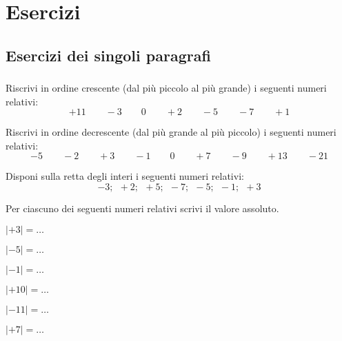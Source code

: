 
\section{Esercizi}

\subsection{Esercizi dei singoli paragrafi}

\subsubsection*{}


\begin{esercizio}
 \label{ese:2.1}
Riscrivi in ordine crescente (dal più piccolo al più grande) i seguenti 
numeri 
relativi:
\[+11\qquad-3\qquad0\qquad+2\qquad-5\qquad-7\qquad+1\]
\end{esercizio}

\begin{esercizio}
 \label{ese:2.2}
Riscrivi in ordine decrescente (dal più grande al più piccolo) i seguenti 
numeri 
relativi:
\[-5\qquad-2\qquad+3\qquad-1\qquad0\qquad+7\qquad-9\qquad+13\qquad-21\]
\end{esercizio}

\begin{esercizio}
 \label{ese:2.3}
Disponi sulla retta degli interi i seguenti numeri relativi:
\[-3;~~ +2;~~ +5;~~ -7;~~ -5;~~ -1;~~ +3\]
\begin{center}
\esec
\end{center}
\end{esercizio}

\begin{esercizio}
 \label{ese:2.4}
Per ciascuno dei seguenti numeri relativi scrivi il valore assoluto.
\begin{htmulticols}{3}
\begin{enumeratees}
 \item \(|+3|=\ldots\)
 \item \(|-5|=\ldots\)
 \item \(|-1|=\ldots\)
 \item \(|+10|=\ldots\)
 \item \(|-11|=\ldots\)
 \item \(|+7|=\ldots\)
\end{enumeratees}
\end{htmulticols}
\end{esercizio}

